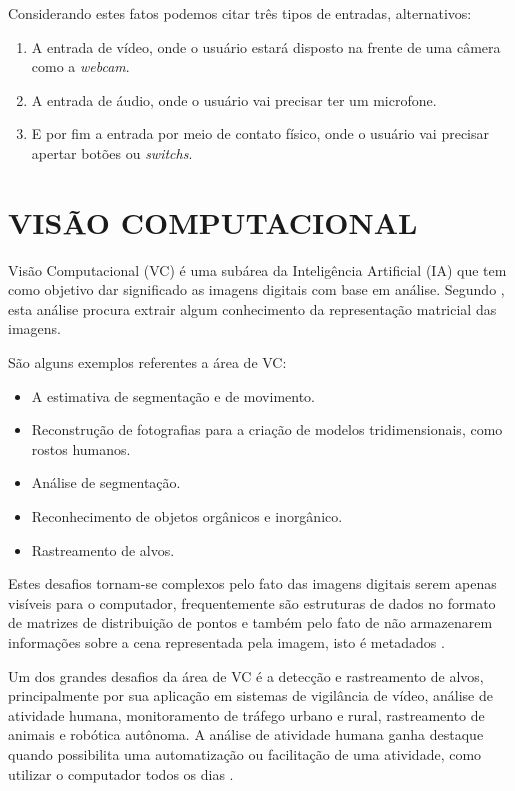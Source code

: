 Considerando estes fatos podemos citar três tipos de entradas, alternativos:

\begin{enumerate}
\item A entrada de vídeo, onde o usuário estará disposto na frente de uma câmera como a \textit{webcam}.

\item A entrada de áudio, onde o usuário vai precisar ter um microfone.

\item E por fim a entrada por meio de contato físico, onde o usuário vai precisar apertar botões ou \textit{switchs}.
\end{enumerate}

% 
% 


\section{VISÃO COMPUTACIONAL}\label{Sub:vc}

Visão Computacional (VC) é uma subárea da Inteligência Artificial (IA) que tem como objetivo dar significado as imagens digitais com base em análise. Segundo , esta análise procura extrair algum conhecimento da representação matricial das imagens. 

São alguns exemplos referentes a área de VC: 
\begin{itemize}
\item A estimativa de segmentação e de movimento.
\item Reconstrução de fotografias para a criação de modelos tridimensionais, como rostos humanos.
\item Análise de segmentação.
\item Reconhecimento de objetos orgânicos e inorgânico.
\item Rastreamento de alvos.
\end{itemize}

Estes desafios tornam-se complexos pelo fato das imagens digitais serem apenas visíveis para o computador, frequentemente são estruturas de dados no formato de matrizes de distribuição de pontos e também pelo fato de não armazenarem informações sobre a cena representada pela imagem, isto é metadados \cite{prince2012computer}.

Um dos grandes desafios da área de VC é a detecção e rastreamento de alvos, principalmente por sua aplicação em sistemas de vigilância de vídeo, análise de atividade humana, monitoramento de tráfego urbano e rural, rastreamento de animais e robótica autônoma. A análise de atividade humana ganha destaque quando possibilita uma automatização ou facilitação de uma atividade, como utilizar o computador todos os dias \cite{alaya2012multipeople-UPPERCASE}.

